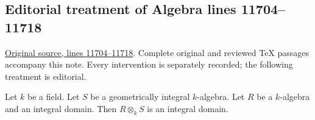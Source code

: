 \subsection{Editorial treatment of Algebra lines 11704--11718}

\hypertarget{algebra-context-156}{}

\noindent\href{https://github.com/stacks/stacks-project/blob/a04446e57ec1fbc252a871afcec7752fb2807b14/algebra.tex\#L11704}{Original source, lines 11704--11718}. Complete original and reviewed TeX passages accompany this note. Every intervention is separately recorded; the following treatment is editorial.


\begin{lemma}
\label{editorial-source-lemma-geometrically-integral-any-integral-base-change}
Let $k$ be a field. Let $S$ be a geometrically integral $k$-algebra.
Let $R$ be a $k$-algebra and an integral domain. Then $R \otimes_k S$
is an integral domain.
\end{lemma}

